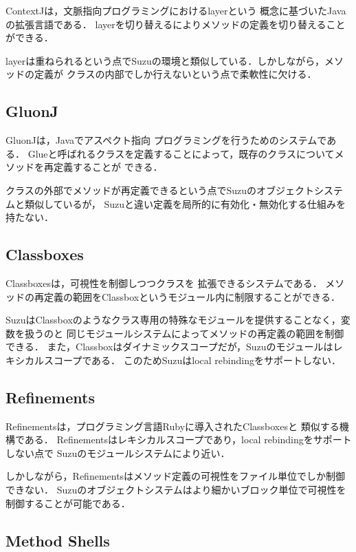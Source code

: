 \documentclass{ipsjprosym}
\begin{document}
ContextJ\cite{AppeltauerMalte:2011}は，文脈指向プログラミングにおけるlayerという
概念に基づいたJavaの拡張言語である．
layerを切り替えるによりメソッドの定義を切り替えることができる．

layerは重ねられるという点でSuzuの環境と類似している．しかしながら，メソッドの定義が
クラスの内部でしか行えないという点で柔軟性に欠ける．

\subsection{GluonJ}

GluonJ\cite{Chiba:2010:MMC:1869459.1869503}は，Javaでアスペクト指向
プログラミングを行うためのシステムである．
Glueと呼ばれるクラスを定義することによって，既存のクラスについてメソッドを再定義することが
できる．

クラスの外部でメソッドが再定義できるという点でSuzuのオブジェクトシステムと類似しているが，
Suzuと違い定義を局所的に有効化・無効化する仕組みを持たない．

\subsection{Classboxes}

Classboxes\cite{Bergel:2005:CCV:1646591.1646599}は，可視性を制御しつつクラスを
拡張できるシステムである．
メソッドの再定義の範囲をClassboxというモジュール内に制限することができる．

SuzuはClassboxのようなクラス専用の特殊なモジュールを提供することなく，変数を扱うのと
同じモジュールシステムによってメソッドの再定義の範囲を制御できる．
また，Classboxはダイナミックスコープだが，Suzuのモジュールはレキシカルスコープである．
このためSuzuはlocal rebindingをサポートしない．

\subsection{Refinements}

Refinements\cite{Maeda:2013}は，プログラミング言語Rubyに導入されたClassboxesと
類似する機構である．
Refinementsはレキシカルスコープであり，local rebindingをサポートしない点で
Suzuのモジュールシステムにより近い．

しかしながら，Refinementsはメソッド定義の可視性をファイル単位でしか制御できない．
Suzuのオブジェクトシステムはより細かいブロック単位で可視性を制御することが可能である．

\subsection{Method Shells}
\end{document}
